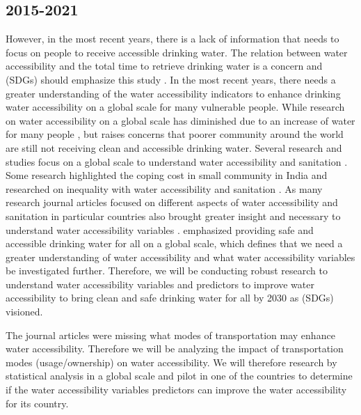 \documentclass[10pt,twoside]{article}
\numberwithin{equation}{section}
\newcommand{\?}{\stackrel{?}{=}}
\begin{document}
\subsection{2015-2021}
However, in the most recent years, there is a lack of information that needs to focus on people to receive accessible drinking water. The relation between water accessibility and the total time to retrieve drinking water is a concern and (SDGs) should emphasize this study \citep{cassivi2018access}. In the most recent years, there needs a greater understanding of the water accessibility indicators to enhance drinking water accessibility on a global scale for many vulnerable people. While research on water accessibility on a global scale has diminished due to an increase of water for many people \citep{fuller2016tracking}, but \citet{deshpande2020mapping} raises concerns that poorer community around the world are still not receiving clean and accessible drinking water. Several research and studies focus on a global scale to understand water accessibility and sanitation \citep{cassivi2018access, tortajada2018achieving, price2019difference,deshpande2020mapping}. Some research highlighted the coping cost in small community in India \citep{amit2019measuring} and researched on inequality with water accessibility and sanitation \citet{amit2019measuring,price2019difference, rawas2020comparing}. As many research journal articles focused on different aspects of water accessibility and sanitation in particular countries also brought greater insight and necessary to understand water accessibility variables \citep{rawas2020comparing, cassivi2021evaluating, martinez-santos2017determinants}. \citet{goal} emphasized providing safe and accessible drinking water for all on a global scale, which defines that we need a greater understanding of water accessibility and what water accessibility variables be investigated further. Therefore, we will be conducting robust research to understand water accessibility variables and predictors to improve water accessibility to bring clean and safe drinking water for all by 2030 as (SDGs) visioned. 

The journal articles were missing what modes of transportation may enhance water accessibility. Therefore we will be analyzing the impact of transportation modes (usage/ownership) on water accessibility. We will therefore research by statistical analysis in a global scale and pilot in one of the countries to determine if the water accessibility variables predictors can improve the water accessibility for its country.
\eject
\end{document}
